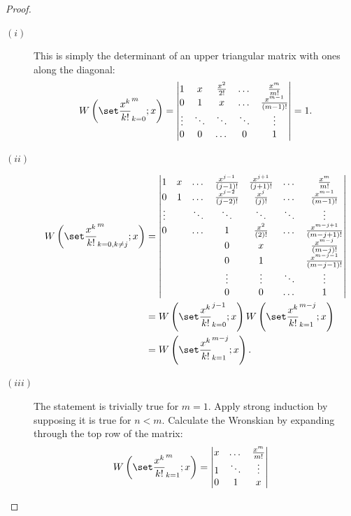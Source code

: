 \documentclass{book}
\begin{document}
\begin{proof}
\begin{description}
\item[$(i)$] This is simply the determinant of an upper triangular matrix with ones along the diagonal:
\begin{equation*}
\Wpoly{k=0}{m} = \begin{vmatrix} 1 & x & \Poly{2} & \dots & \Poly{m} \\
0 & 1 & x & \dots & \poly{m-1} \\
\vdots & \ddots & \ddots & \ddots & \vdots \\
0 & 0 & \dots & 0 & 1 \end{vmatrix} = 1 .
\end{equation*}
\item[$(ii)$] \begin{align*}
\Wpoly{k=0,k \neq j}{m} & =
\begin{vmatrix}
1      & x & \dots  & \poly{j-1} & \poly{j+1} & \dots & \Poly{m}    \\
0      & 1 & \dots  & \poly{j-2} & \poly{j}   & \dots & \poly{m-1}  \\
\vdots &   & \ddots & \ddots     & \ddots     & \ddots& \vdots      \\
0      &   & \dots  & 1          & \poly{2}   & \dots & \poly{m-j+1}\\
       &   &        & 0          & x          &       & \poly{m-j}  \\
       &   &        & 0          & 1          &       & \poly{m-j-1}\\
       &   &        & \vdots     & \vdots     & \ddots& \vdots      \\
       &   &        & 0          & 0          & \dots & 1
\end{vmatrix} \\
& = \Wpoly{k=0}{j-1} \Wpoly{k=1}{m-j} \\
& = \Wpoly{k=1}{m-j} .
\end{align*}
\item[$(iii)$] The statement is trivially true for $m=1$.
Apply strong induction by supposing it is true for $n<m$.
Calculate the Wronskian by expanding through the top row of the matrix:
\begin{align*}
\Wpoly{k=1}{m} & = \begin{vmatrix}
x & \dots & \Poly{m} \\
1 & \ddots & \vdots \\
0 & 1 & x \end{vmatrix}

\end{align*}
\end{description}
\end{proof}
\end{document}
